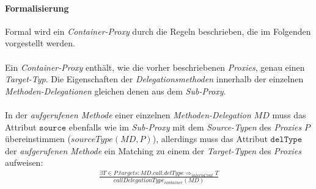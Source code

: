\paragraph{Formalisierung}
Formal wird ein \emph{Container-Proxy} durch die Regeln beschrieben, die im Folgenden vorgestellt werden.
\\\\
Ein \emph{Container-Proxy} enthält, wie die vorher beschriebenen \emph{Proxies}, genau einen \emph{Target-Typ}. Die Eigenschaften der \emph{Delegationsmethoden} innerhalb der einzelnen \emph{Methoden-Delegationen} gleichen denen aus dem \emph{Sub-Proxy}.
\\\\
In der \emph{aufgerufenen Methode} einer einzelnen \emph{Methoden-Delegation} $\mathit{MD}$ muss das Attribut $\texttt{source}$ ebenfalls wie im \emph{Sub-Proxy} mit dem \emph{Source-Typen} des \emph{Proxies} $P$ übereinstimmen ($\mathit{sourceType(MD,P)}$), allerdings muss das Attribut $\texttt{delType}$ der \emph{aufgerufenen Methode} ein Matching zu einem der \emph{Target-Typen} des \emph{Proxies} aufweisen:
\begin{gather*}
\frac{\exists T \in \mathit{P.targets}:\mathit{MD.call.delType} \Rightarrow_{internCont} T}
{\mathit{callDelegationType_{container}(MD)}}
\end{gather*}
\noindent




